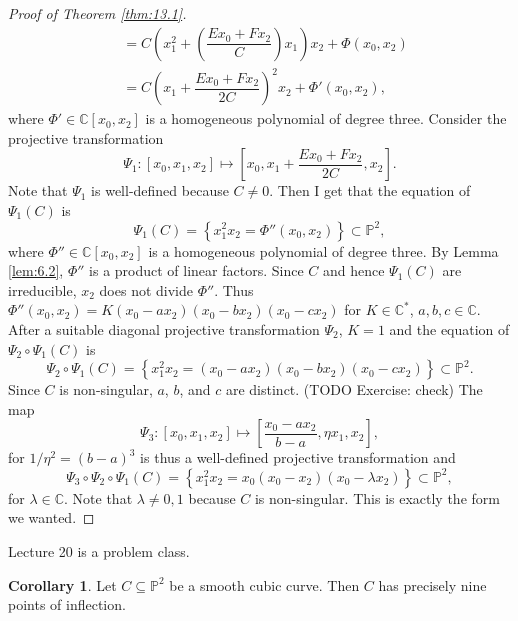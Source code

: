 \documentclass{article}
\newcommand{\C}{\mathbb{C}}
\renewcommand{\P}{\mathbb{P}}
\newcommand{\rb}[1]{\left( #1 \right)}
\renewcommand{\sb}[1]{\left[ #1 \right]}
\newcommand{\cb}[1]{\left\{ #1 \right\}}
\theoremstyle{definition}\newtheorem{definition}{Definition}[section]
\theoremstyle{definition}\newtheorem{notation}[definition]{Notation}
\theoremstyle{definition}\newtheorem{remark}[definition]{Remark}
\theoremstyle{definition}\newtheorem{example}[definition]{Example}
\theoremstyle{definition}\newtheorem{fact}{Fact}
\theoremstyle{definition}\newtheorem{exercise}{Exercise}
\newtheorem{corollary}[definition]{Corollary}
\begin{document}
\begin{proof}[Proof of Theorem \ref{thm:13.1}]
\begin{align*}
& = C\rb{x_1^2 + \rb{\dfrac{Ex_0 + Fx_2}{C}}x_1}x_2 + \Phi\rb{x_0, x_2} \\
& = C\rb{x_1 + \dfrac{Ex_0 + Fx_2}{2C}}^2x_2 + \Phi'\rb{x_0, x_2},
\end{align*}
where $ \Phi' \in \C\sb{x_0, x_2} $ is a homogeneous polynomial of degree three. Consider the projective transformation
$$ \Psi_1 : \sb{x_0, x_1, x_2} \mapsto \sb{x_0, x_1 + \dfrac{Ex_0 + Fx_2}{2C}, x_2}. $$
Note that $ \Psi_1 $ is well-defined because $ C \ne 0 $. Then I get that the equation of $ \Psi_1\rb{C} $ is
$$ \Psi_1\rb{C} = \cb{x_1^2x_2 = \Phi''\rb{x_0, x_2}} \subset \P^2, $$
where $ \Phi'' \in \C\sb{x_0, x_2} $ is a homogeneous polynomial of degree three. By Lemma \ref{lem:6.2}, $ \Phi'' $ is a product of linear factors. Since $ C $ and hence $ \Psi_1\rb{C} $ are irreducible, $ x_2 $ does not divide $ \Phi'' $. Thus $ \Phi''\rb{x_0, x_2} = K\rb{x_0 - ax_2}\rb{x_0 - bx_2}\rb{x_0 - cx_2} $ for $ K \in \C^* $, $ a, b, c \in \C $. After a suitable diagonal projective transformation $ \Psi_2 $, $ K = 1 $ and the equation of $ \Psi_2 \circ \Psi_1\rb{C} $ is
$$ \Psi_2 \circ \Psi_1\rb{C} = \cb{x_1^2x_2 = \rb{x_0 - ax_2}\rb{x_0 - bx_2}\rb{x_0 - cx_2}} \subset \P^2. $$
Since $ C $ is non-singular, $ a $, $ b $, and $ c $ are distinct. (TODO Exercise: check) The map
$$ \Psi_3 : \sb{x_0, x_1, x_2} \mapsto \sb{\dfrac{x_0 - ax_2}{b - a}, \eta x_1, x_2}, $$
for $ 1 / \eta^2 = \rb{b - a}^3 $ is thus a well-defined projective transformation and
$$ \Psi_3 \circ \Psi_2 \circ \Psi_1\rb{C} = \cb{x_1^2x_2 = x_0\rb{x_0 - x_2}\rb{x_0 - \lambda x_2}} \subset \P^2, $$
for $ \lambda \in \C $. Note that $ \lambda \ne 0, 1 $ because $ C $ is non-singular. This is exactly the form we wanted.
\end{proof}


Lecture 20 is a problem class.


\begin{corollary}
Let $ C \subseteq \P^2 $ be a smooth cubic curve. Then $ C $ has precisely nine points of inflection.
\end{corollary}
\end{document}
